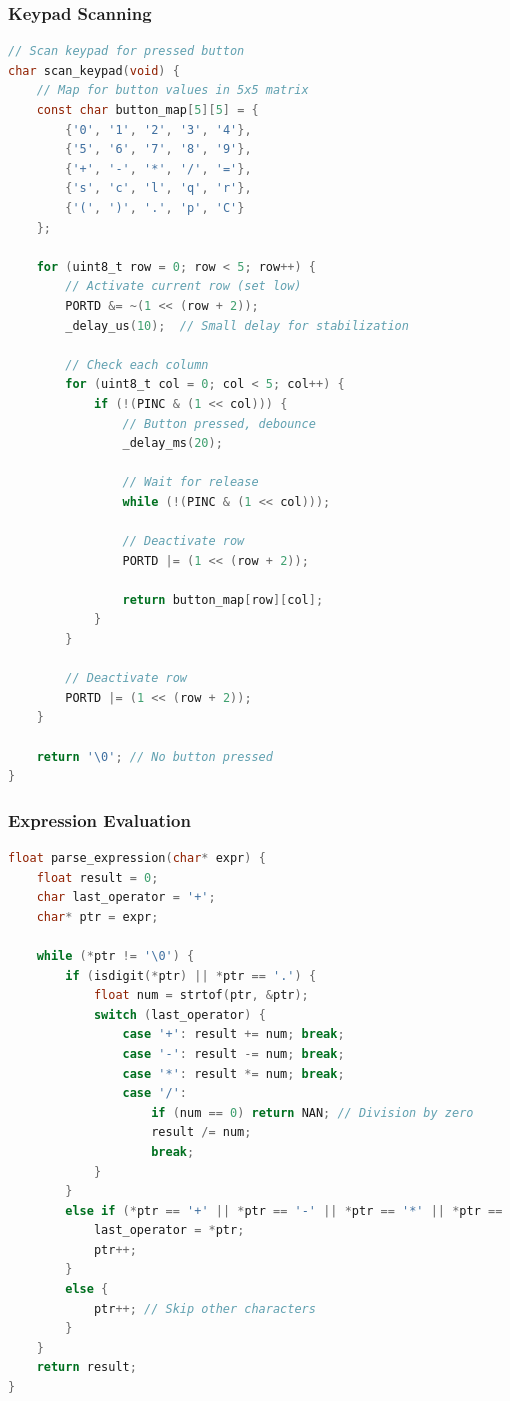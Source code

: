 \documentclass{article}
\begin{document}
\subsubsection{Keypad Scanning}
\begin{lstlisting}[language=C]
// Scan keypad for pressed button
char scan_keypad(void) {
    // Map for button values in 5x5 matrix
    const char button_map[5][5] = {
        {'0', '1', '2', '3', '4'},
        {'5', '6', '7', '8', '9'},
        {'+', '-', '*', '/', '='},
        {'s', 'c', 'l', 'q', 'r'},
        {'(', ')', '.', 'p', 'C'}
    };
    
    for (uint8_t row = 0; row < 5; row++) {
        // Activate current row (set low)
        PORTD &= ~(1 << (row + 2));
        _delay_us(10);  // Small delay for stabilization
        
        // Check each column
        for (uint8_t col = 0; col < 5; col++) {
            if (!(PINC & (1 << col))) {
                // Button pressed, debounce
                _delay_ms(20);
                
                // Wait for release
                while (!(PINC & (1 << col)));
                
                // Deactivate row
                PORTD |= (1 << (row + 2));
                
                return button_map[row][col];
            }
        }
        
        // Deactivate row
        PORTD |= (1 << (row + 2));
    }
    
    return '\0'; // No button pressed
}
\end{lstlisting}

\subsubsection{Expression Evaluation}
\begin{lstlisting}[language=C]
float parse_expression(char* expr) {
    float result = 0;
    char last_operator = '+';
    char* ptr = expr;
    
    while (*ptr != '\0') {
        if (isdigit(*ptr) || *ptr == '.') {
            float num = strtof(ptr, &ptr);
            switch (last_operator) {
                case '+': result += num; break;
                case '-': result -= num; break;
                case '*': result *= num; break;
                case '/': 
                    if (num == 0) return NAN; // Division by zero
                    result /= num; 
                    break;
            }
        } 
        else if (*ptr == '+' || *ptr == '-' || *ptr == '*' || *ptr == '/') {
            last_operator = *ptr;
            ptr++;
        }
        else {
            ptr++; // Skip other characters
        }
    }
    return result;
}
\end{lstlisting}
\end{document}
